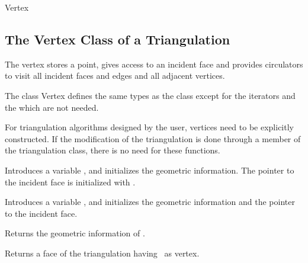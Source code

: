 \begin{ccClass}{Vertex}
\subsection{The Vertex Class of a Triangulation}
\label{I1_Sect_Triangulation_Vertex}

\ccThreeToTwo



\ccDefinition

The vertex stores a point, gives access to an incident face
and provides circulators to visit all incident faces and edges
and all adjacent vertices.


\ccTypes
The class  {Vertex} defines the same types 
as the class  except for the iterators and the 
 which are not needed.

\begin{ccAdvanced}
\ccCreation
For triangulation algorithms designed by the user, vertices need to be
explicitly constructed.  If the modification of the triangulation is
done through a member of the triangulation class, there is no need for these
functions.


{Introduces a variable \ccVar, and initializes the geometric information.
The pointer to the incident face is initialized with .}

{Introduces a variable \ccVar, and initializes the geometric information and 
the pointer to the incident face.}
\end{ccAdvanced}




{Returns  the geometric information of \ccVar.}

{Returns a face of the triangulation having  \ccVar\ as vertex.}


\begin{ccAdvanced}
\end{ccAdvanced}




\end{ccClass}
